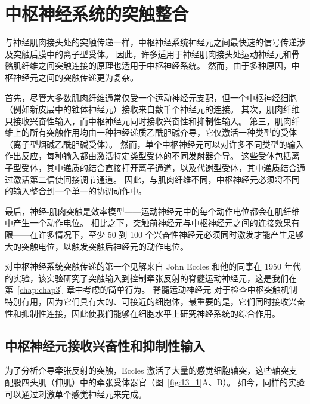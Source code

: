 \chapter{中枢神经系统的突触整合} \label{chap:chap13}

与神经肌肉接头处的突触传递一样，中枢神经系统神经元之间最快速的信号传递涉及突触后膜中的离子型受体。
因此，许多适用于神经肌肉接头处运动神经元和骨骼肌纤维之间突触连接的原理也适用于中枢神经系统。
然而，由于多种原因，中枢神经元之间的突触传递更为复杂。


首先，尽管大多数肌肉纤维通常仅受一个运动神经元支配，但一个中枢神经细胞（例如新皮层中的锥体神经元）接收来自数千个神经元的连接。
其次，肌肉纤维只接收兴奋性输入，而中枢神经元同时接收兴奋性和抑制性输入。
第三，肌肉纤维上的所有突触作用均由一种神经递质乙酰胆碱介导，它仅激活一种类型的受体（离子型烟碱乙酰胆碱受体）。
然而，单个中枢神经元可以对许多不同类型的输入作出反应，每种输入都由激活特定类型受体的不同发射器介导。 
这些受体包括离子型受体，其中递质的结合直接打开离子通道，以及代谢型受体，其中递质结合通过激活第二信使间接调节通道。
因此，与肌肉纤维不同，中枢神经元必须将不同的输入整合到一个单一的协调动作中。


最后，神经-肌肉突触是效率模型——运动神经元中的每个动作电位都会在肌纤维中产生一个动作电位。
相比之下，突触前神经元与中枢神经元之间的连接效果有限——在许多情况下，至少 50 到 100 个兴奋性神经元必须同时激发才能产生足够大的突触电位，以触发突触后神经元的动作电位。


对中枢神经系统突触传递的第一个见解来自 John Eccles 和他的同事在 1950 年代的实验，该实验研究了突触输入到控制牵张反射的脊髓运动神经元，这是我们在第~\ref{chap:chap3}~章中考虑的简单行为。
脊髓运动神经元 对于检查中枢突触机制特别有用，因为它们具有大的、可接近的细胞体，最重要的是，它们同时接收兴奋性和抑制性连接，因此使我们能够在细胞水平上研究神经系统的综合作用。



\section{中枢神经元接收兴奋性和抑制性输入}

为了分析介导牵张反射的突触，Eccles 激活了大量的感觉细胞轴突，这些轴突支配股四头肌（伸肌）中的牵张受体器官（图~\ref{fig:13_1}A、B）。 
如今，同样的实验可以通过刺激单个感觉神经元来完成。


